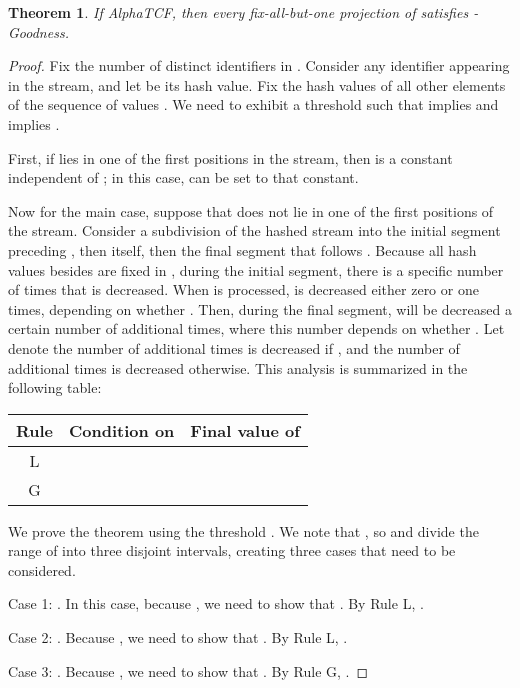 \documentclass{article}
\newcommand{\edit}[1]{{#1}}
\newtheorem{theorem}{Theorem}[section]
\begin{document}
\begin{theorem}\label{thm:alpha-sat}
If  AlphaTCF, then every fix-all-but-one projection  of  satisfies -Goodness.
\end{theorem}
\begin{proof}
Fix the number of distinct identifiers  in . Consider any identifier  appearing in the stream,
and let  be its hash value. Fix the hash values of all other elements of the sequence of values .
We need to exhibit a threshold  such that  implies  and  implies .

First, if  lies in one of the first  positions in the stream, then  is a constant independent of ; in
this case,  can be set to that constant.






Now for the main case, suppose that  does not lie in one of the first  positions of the stream.
Consider a subdivision of the hashed stream into the initial segment preceding , 
then  itself, then the final segment that follows . Because all hash values besides  are fixed in ,
during the initial segment, there is a specific number  of times that 
 is decreased. When  is processed,  is decreased either zero or one times,
depending on whether .
Then, during the final segment,  will be decreased a certain number of additional times, where 
this number depends on whether . Let  denote the number of additional times 
is decreased if , and  the number of additional times  is decreased otherwise.
This analysis is summarized in the following table:

\begin{center}
\begin{tabular}{|c|c|c|}
\hline
Rule & Condition on  & Final value of  \\
\hline
\edit{L} &  &  \\
\hline
\edit{G} &  &  \\
\hline
\end{tabular}
\end{center}


We prove the theorem using the threshold . We note that
, so  and  divide the range of 
into three disjoint intervals, creating three cases that need to be considered.

Case 1: . In this case, because , we need to show that .
By Rule \edit{L}, .

Case 2: . Because , we need to show that . 
By Rule \edit{L}, .

Case 3: . Because , we need to show that . 
By Rule \edit{G}, .
\end{proof}
\end{document}
